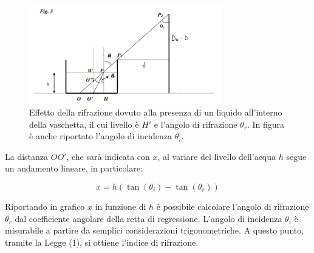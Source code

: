 \begin{figure}[H]
	\centering
	\includegraphics[width=0.75\textwidth]{./figures/Im3}
	\caption{Effetto della rifrazione dovuto alla presenza di un liquido all'interno della vaschetta, il cui livello è $H'$ e l'angolo di rifrazione $\theta_r$. In figura è anche riportato l'angolo di incidenza $\theta_i$.}
\end{figure}

La distanza $OO'$, che sarà indicata con $x$, al variare del livello dell'acqua $h$ segue un andamento lineare, in particolare: 

\begin{equation}
	x=h(\tan(\theta_i)-\tan(\theta_r))
\end{equation}

Riportando in grafico $x$ in funzione di $h$ è possibile calcolare l'angolo di rifrazione $\theta_r$ dal coefficiente angolare della retta di regressione. L'angolo di incidenza $\theta_i$ è misurabile a partire da semplici considerazioni trigonometriche. A questo punto, tramite la Legge (1), si ottiene l'indice di rifrazione.

